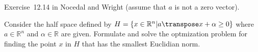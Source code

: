 \begin{problem}\label{prob:03}%
  Exercise~12.14 in Nocedal and Wright (assume that $a$ is not a zero vector).
  
  Consider the half space defined by $H=\{x\in \mathbb{R}^n \vert a\transpose x + \alpha \geq 0 \}$ where $a\in \mathbb{R}^n$ and $\alpha \in \mathbb{R}$ are given.  Formulate and solve the optmization problem for finding the point $x$ in $H$ that has the smallest Euclidian norm.
\end{problem}


